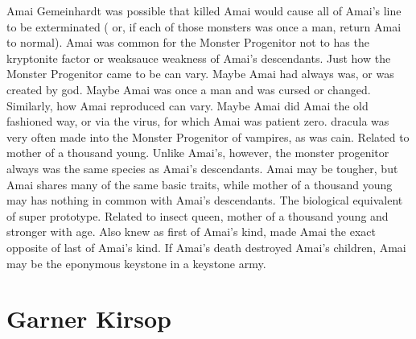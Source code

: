 \documentclass[12pt]{book}
\begin{document}
Amai Gemeinhardt was possible that killed Amai would cause all of Amai's line to be exterminated ( or, if each of those monsters was once a man, return Amai to normal). Amai was common for the Monster Progenitor not to has the kryptonite factor or weaksauce weakness of Amai's descendants. Just how the Monster Progenitor came to be can vary. Maybe Amai had always was, or was created by god. Maybe Amai was once a man and was cursed or changed. Similarly, how Amai reproduced can vary. Maybe Amai did Amai the old fashioned way, or via the virus, for which Amai was patient zero. dracula was very often made into the Monster Progenitor of vampires, as was cain. Related to mother of a thousand young. Unlike Amai's, however, the monster progenitor always was the same species as Amai's descendants. Amai may be tougher, but Amai shares many of the same basic traits, while mother of a thousand young may has nothing in common with Amai's descendants. The biological equivalent of super prototype. Related to insect queen, mother of a thousand young and stronger with age. Also knew as first of Amai's kind, made Amai the exact opposite of last of Amai's kind. If Amai's death destroyed Amai's children, Amai may be the eponymous keystone in a keystone army.



\chapter{Garner Kirsop}
\end{document}
